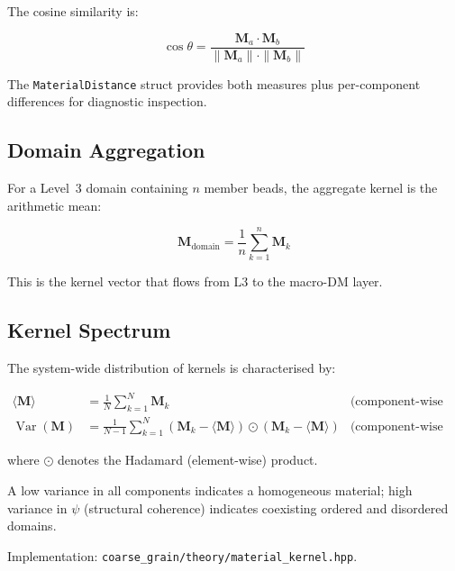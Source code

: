 \documentclass[11pt, a4paper, oneside]{article}
\newcommand{\file}[1]{\texttt{#1}}
\newcommand{\type}[1]{\texttt{#1}}
\DeclareMathOperator{\Var}{Var}
\begin{document}
The cosine similarity is:

\begin{equation}
\cos\theta = \frac{\mathbf{M}_a \cdot \mathbf{M}_b}
  {\|\mathbf{M}_a\|\cdot\|\mathbf{M}_b\|}
\label{eq:cosine}
\end{equation}

The \type{MaterialDistance} struct provides both measures plus
per-component differences for diagnostic inspection.

\subsection{Domain Aggregation}

For a Level~3 domain containing $n$ member beads, the aggregate
kernel is the arithmetic mean:

\begin{equation}
\mathbf{M}_{\mathrm{domain}} = \frac{1}{n}\sum_{k=1}^{n} \mathbf{M}_k
\label{eq:Mdomain}
\end{equation}

This is the kernel vector that flows from L3 to the macro-DM layer.

\subsection{Kernel Spectrum}

The system-wide distribution of kernels is characterised by:

\begin{align}
\langle\mathbf{M}\rangle &= \frac{1}{N}\sum_{k=1}^{N} \mathbf{M}_k
  &\text{(component-wise mean)} \label{eq:Mmean} \\
\Var(\mathbf{M}) &= \frac{1}{N-1}\sum_{k=1}^{N}
  (\mathbf{M}_k - \langle\mathbf{M}\rangle)
  \odot
  (\mathbf{M}_k - \langle\mathbf{M}\rangle)
  &\text{(component-wise variance)} \label{eq:Mvar}
\end{align}

where $\odot$ denotes the Hadamard (element-wise) product.

A low variance in all components indicates a homogeneous material;
high variance in $\psi$ (structural coherence) indicates coexisting
ordered and disordered domains.

Implementation: \file{coarse\_grain/theory/material\_kernel.hpp}.


\end{document}
